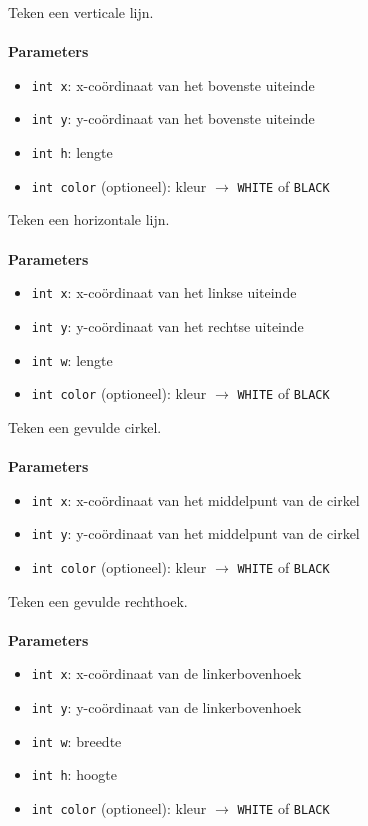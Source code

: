 \documentclass[11pt,fleqn]{book} %
\begin{document}
\begin{libf}[drawFastVLine(x, y, h, \emph{color=WHITE})]
	Teken een verticale lijn.\\ \\
	\textbf{Parameters}
	\begin{itemize}
		\item \texttt{int x}: x-coördinaat van het bovenste uiteinde
		\item \texttt{int y}: y-coördinaat van het bovenste uiteinde
		\item \texttt{int h}: lengte
		\item \texttt{int color} (optioneel): kleur $\rightarrow$ \texttt{WHITE} of \texttt{BLACK}
	\end{itemize}
\end{libf}

\begin{libf}[drawFastHLine(x, y, w, \emph{color=WHITE})]
	Teken een horizontale lijn.\\ \\
	\textbf{Parameters}
	\begin{itemize}
		\item \texttt{int x}: x-coördinaat van het linkse uiteinde
		\item \texttt{int y}: y-coördinaat van het rechtse uiteinde
		\item \texttt{int w}: lengte
		\item \texttt{int color} (optioneel): kleur $\rightarrow$ \texttt{WHITE} of \texttt{BLACK}
	\end{itemize}
\end{libf}

\begin{libf}[fillCircle(x, y, r, \emph{color=WHITE})]
	Teken een gevulde cirkel.\\ \\
	\textbf{Parameters}
	\begin{itemize}
		\item \texttt{int x}: x-coördinaat van het middelpunt van de cirkel
		\item \texttt{int y}: y-coördinaat van het middelpunt van de cirkel
		\item \texttt{int color} (optioneel): kleur $\rightarrow$ \texttt{WHITE} of \texttt{BLACK}
	\end{itemize}
\end{libf}

\begin{libf}[fillRect(x, y, w, h, \emph{color=WHITE})]
	Teken een gevulde rechthoek.\\ \\
	\textbf{Parameters}
	\begin{itemize}
		\item \texttt{int x}: x-coördinaat van de linkerbovenhoek
		\item \texttt{int y}: y-coördinaat van de linkerbovenhoek
		\item \texttt{int w}: breedte
		\item \texttt{int h}: hoogte
		\item \texttt{int color} (optioneel): kleur $\rightarrow$ \texttt{WHITE} of \texttt{BLACK}
	\end{itemize}
\end{libf}
\end{document}

